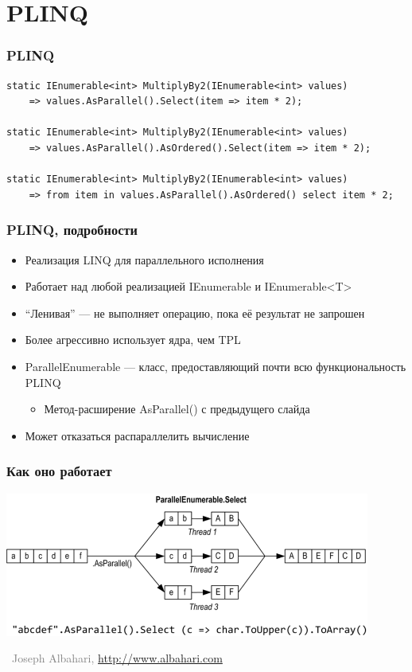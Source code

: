 \documentclass[xetex,mathserif,serif]{beamer}
\newcommand{\attribution}[1] {
\vspace{-2mm}\begin{flushright}\begin{scriptsize}\textcolor{gray}{\textcopyright\, #1}\end{scriptsize}\end{flushright}
}
\begin{document}
	\section{PLINQ}

	\begin{frame}[fragile]
		\frametitle{PLINQ}
		\begin{small}
			\begin{verbatim}
static IEnumerable<int> MultiplyBy2(IEnumerable<int> values)
    => values.AsParallel().Select(item => item * 2);

static IEnumerable<int> MultiplyBy2(IEnumerable<int> values)
    => values.AsParallel().AsOrdered().Select(item => item * 2);

static IEnumerable<int> MultiplyBy2(IEnumerable<int> values)
    => from item in values.AsParallel().AsOrdered() select item * 2;
			\end{verbatim}
		\end{small}
	\end{frame}

	\begin{frame}
		\frametitle{PLINQ, подробности}
		\begin{itemize}
			\item Реализация LINQ для параллельного исполнения
			\item Работает над любой реализацией IEnumerable и IEnumerable<T>
			\item ``Ленивая'' --- не выполняет операцию, пока её результат не запрошен
			\item Более агрессивно использует ядра, чем TPL
			\item ParallelEnumerable --- класс, предоставляющий почти всю функциональность PLINQ
			\begin{itemize}
				\item Метод-расширение AsParallel() с предыдущего слайда
			\end{itemize}
			\item Может отказаться распараллелить вычисление
		\end{itemize}
	\end{frame}

	\begin{frame}
		\frametitle{Как оно работает}
		\begin{center}
			\includegraphics[width=0.9\textwidth]{parallelEnumerable.png}
			\attribution{Joseph Albahari, \url{http://www.albahari.com}}
		\end{center}
	\end{frame}
\end{document}
